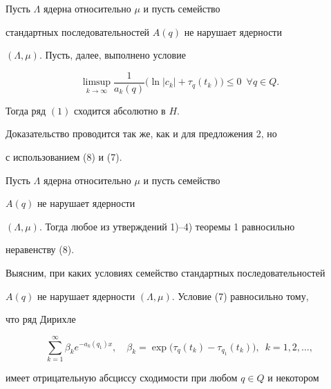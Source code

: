 \begin{prop}


Пусть $\Lambda$ ядерна относительно $\mu$ и пусть семейство


стандартных последовательностей $A(q)$ не нарушает ядерности


$(\Lambda,\mu)$. Пусть, далее, выполнено условие


\begin{equation}


 \limsup\limits_{k\to\infty}\frac{1}{a_k(q)}


\bigl(\ln|c_k|+\tau_q(t_k)\bigr)\leqslant 0\ \; \forall q\in Q .


\end{equation}


Тогда ряд $(1)$ сходится абсолютно в $H$.


\end{prop}





Доказательство проводится так же, как и для предложения 2, но


с использованием (8) и (7).





\begin{cornonum}


Пусть $\Lambda$ ядерна относительно $\mu$ и пусть семейство


$A(q)$ не нарушает ядерности


$(\Lambda,\mu)$. Тогда любое из утверждений 1)--4) теоремы 1 равносильно


неравенству (8).


\end{cornonum}





Выясним, при каких условиях семейство стандартных последовательностей


$A(q)$ не нарушает ядерности $(\Lambda,\mu)$. Условие (7) равносильно тому,


что ряд Дирихле


$$


\sum\limits_{k=1}^{\infty}\beta_ke^{-a_k(q_1)x},\quad \beta_k=


\exp\bigl(\tau_q(t_k)-\tau_{q_1}(t_k)\bigr),\ \;k=1,2,\dotsc,


$$


имеет отрицательную абсциссу сходимости при любом $q\in Q$ и некотором


